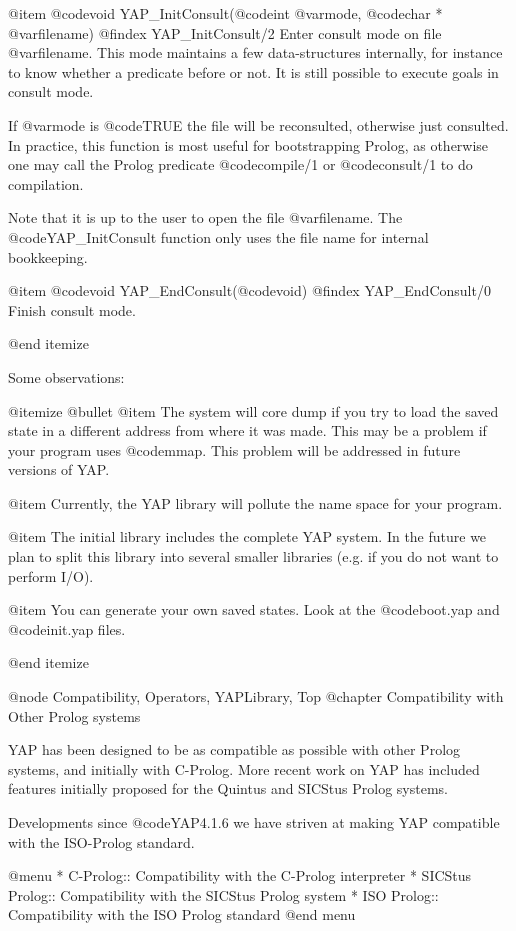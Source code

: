 {{{{{{{{@item  @code{void} YAP_InitConsult(@code{int} @var{mode}, @code{char *} @var{filename})
@findex YAP_InitConsult/2
Enter consult mode on file @var{filename}. This mode maintains a few
data-structures internally, for instance to know whether a predicate
before or not. It is still possible to execute goals in consult mode.

If @var{mode} is @code{TRUE} the file will be reconsulted, otherwise
just consulted. In practice, this function is most useful for
bootstrapping Prolog, as otherwise one may call the Prolog predicate
@code{compile/1} or @code{consult/1} to do compilation.

Note that it is up to the user to open the file @var{filename}. The
@code{YAP_InitConsult} function only uses the file name for internal
bookkeeping.

@item  @code{void} YAP_EndConsult(@code{void})
@findex YAP_EndConsult/0
Finish consult mode.

@end itemize

Some observations:

@itemize @bullet
@item The system will core dump if you try to load the saved state in a
different address from where it was made. This may be a problem if
your program uses @code{mmap}. This problem will be addressed in future
versions of YAP.

@item Currently, the YAP library will pollute the name
space for your program.

@item The initial library includes the complete YAP system. In
the future we plan to split this library into several smaller libraries
(e.g. if you do not want to perform I/O).

@item You can generate your own saved states. Look at  the
@code{boot.yap} and @code{init.yap} files.

@end itemize

@node Compatibility, Operators, YAPLibrary, Top
@chapter Compatibility with Other Prolog systems

YAP has been designed to be as compatible as possible with
other Prolog systems, and initially with C-Prolog. More recent work on
YAP has included features initially proposed for the Quintus
and SICStus Prolog systems.

Developments since @code{YAP4.1.6} we have striven at making
YAP compatible with the ISO-Prolog standard. 

@menu
* C-Prolog:: Compatibility with the C-Prolog interpreter
* SICStus Prolog:: Compatibility with the SICStus Prolog system
* ISO Prolog::  Compatibility with the ISO Prolog standard
@end menu

}}}}}}}}

